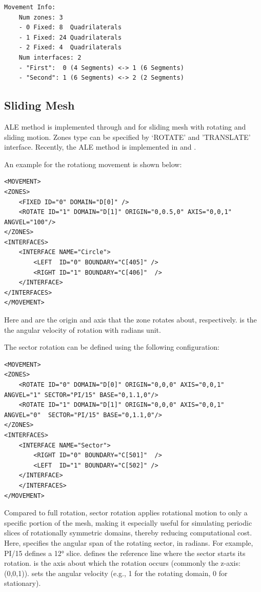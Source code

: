 \begin{lstlisting}
Movement Info:
	Num zones: 3
	- 0 Fixed: 8  Quadrilaterals
	- 1 Fixed: 24 Quadrilaterals
	- 2 Fixed: 4  Quadrilaterals
	Num interfaces: 2
	- "First":  0 (4 Segments) <-> 1 (6 Segments)
	- "Second": 1 (6 Segments) <-> 2 (2 Segments)
\end{lstlisting}


\subsection{Sliding Mesh}\label{subsec:Sliding Mesh}
ALE method is implemented through  and  for sliding 
mesh with rotating and sliding motion. Zones type can be specified by `ROTATE' and 
'TRANSLATE' interface. Recently, the ALE method is implemented in  
and .

An example for the rotationg movement is shown below:

\begin{lstlisting}[style=XMLStyle]
<MOVEMENT>
<ZONES>
    <FIXED ID="0" DOMAIN="D[0]" />
    <ROTATE ID="1" DOMAIN="D[1]" ORIGIN="0,0.5,0" AXIS="0,0,1" ANGVEL="100"/>
</ZONES>
<INTERFACES>
    <INTERFACE NAME="Circle">
        <LEFT  ID="0" BOUNDARY="C[405]" />
        <RIGHT ID="1" BOUNDARY="C[406]"  />
    </INTERFACE>
</INTERFACES>
</MOVEMENT>
\end{lstlisting}

Here  and  are the origin and axis that the zone rotates about, 
respectively.  is the the angular velocity of rotation with radians unit. 

The sector rotation can be defined using the following configuration:
\begin{lstlisting}[style=XMLStyle]
<MOVEMENT>
<ZONES>
    <ROTATE ID="0" DOMAIN="D[0]" ORIGIN="0,0,0" AXIS="0,0,1" ANGVEL="1" SECTOR="PI/15" BASE="0,1.1,0"/>
    <ROTATE ID="1" DOMAIN="D[1]" ORIGIN="0,0,0" AXIS="0,0,1" ANGVEL="0"  SECTOR="PI/15" BASE="0,1.1,0"/>
</ZONES>
<INTERFACES>
    <INTERFACE NAME="Sector">
        <RIGHT ID="0" BOUNDARY="C[501]"  />
        <LEFT  ID="1" BOUNDARY="C[502]" />
    </INTERFACE>
    </INTERFACES>
</MOVEMENT>
\end{lstlisting}

Compared to full rotation, sector rotation applies rotational motion to only a specific portion of the mesh, 
making it especially useful for simulating periodic slices of rotationally symmetric domains, thereby reducing computational cost.
Here,  specifies the angular span of the rotating sector, in radians. For example, PI/15 defines a 12° slice. 
 defines the reference line where the sector starts its rotation. 
 is the axis about which the rotation occurs (commonly the z-axis: (0,0,1)).
 sets the angular velocity (e.g., 1 for the rotating domain, 0 for stationary).

